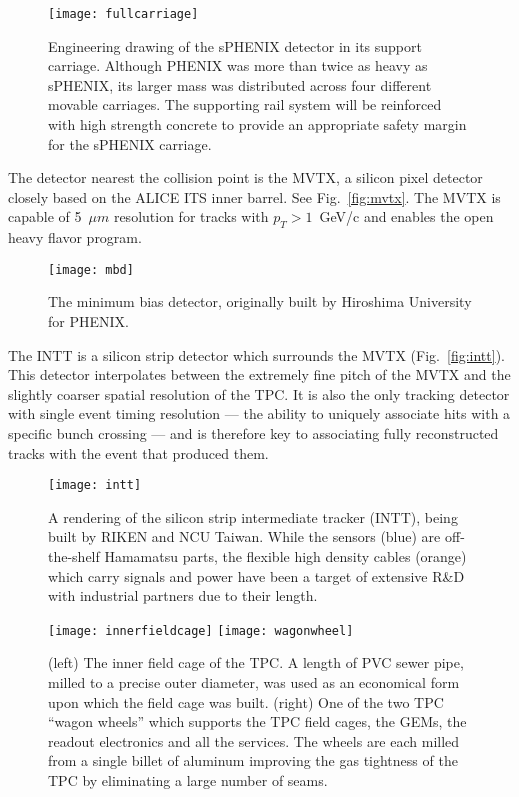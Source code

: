 \begin{figure}[hbt!]
  \centering
  \texttt{[image: fullcarriage]}
  \caption{Engineering drawing of the sPHENIX detector in its support
    carriage.  Although PHENIX was more than twice as heavy as
    sPHENIX, its larger mass was distributed across four different
    movable carriages.  The supporting rail system will be reinforced
    with high strength concrete to provide an appropriate safety
    margin for the sPHENIX carriage.}
  \label{fig:carriage}
\end{figure}

The detector nearest the collision point is the MVTX, a silicon pixel
detector closely based on the ALICE ITS inner barrel.  See
Fig.~\ref{fig:mvtx}.  The MVTX is capable of 5~$\mu m$ resolution for
tracks with $p_T > 1$~GeV/c and enables the open heavy flavor program.

\begin{figure}[hbt!]
  \centering
  \texttt{[image: mbd]}
  \caption{The minimum bias detector, originally built by Hiroshima
    University for PHENIX.}
  \label{fig:mbd}
\end{figure}

The INTT is a silicon strip detector which surrounds the MVTX
(Fig.~\ref{fig:intt}).  This detector interpolates between the
extremely fine pitch of the MVTX and the slightly coarser spatial
resolution of the TPC.  It is also the only tracking detector with
single event timing resolution --- the ability to uniquely associate
hits with a specific bunch crossing --- and is therefore key to
associating fully reconstructed tracks with the event that produced
them.

\begin{figure}[hbt!]
  \centering
  \texttt{[image: intt]}
  \caption{A rendering of the silicon strip intermediate tracker
    (INTT), being built by RIKEN and NCU Taiwan.  While the sensors
    (blue) are off-the-shelf Hamamatsu parts, the flexible high
    density cables (orange) which carry signals and power have been a
    target of extensive R\&D with industrial partners due to their
    length.}
  \label{fig:mbd}
\end{figure}


\begin{figure}[hbt!]
  \centering
  \texttt{[image: innerfieldcage]}
  \hfill
  \texttt{[image: wagonwheel]}
  \caption{(left) The inner field cage of the TPC. A length of PVC
    sewer pipe, milled to a precise outer diameter, was used as an
    economical form upon which the field cage was built.  (right) One
    of the two TPC ``wagon wheels'' which supports the TPC field
    cages, the GEMs, the readout electronics and all the services.
    The wheels are each milled from a single billet of aluminum
    improving the gas tightness of the TPC by eliminating a large
    number of seams.}
  \label{fig:wagonwheel}
\end{figure}

